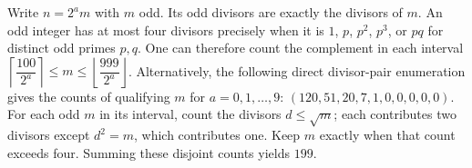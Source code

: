 Write $n=2^a m$ with $m$ odd. Its odd divisors are exactly the divisors of $m$. An odd integer has at most four divisors precisely when it is $1$, $p$, $p^2$, $p^3$, or $pq$ for distinct odd primes $p,q$. One can therefore count the complement in each interval $\left\lceil\dfrac{100}{2^a}\right\rceil\le m\le\left\lfloor\dfrac{999}{2^a}\right\rfloor$. Alternatively, the following direct divisor-pair enumeration gives the counts of qualifying $m$ for $a=0,1,\ldots,9$: $(120, 51, 20, 7, 1, 0, 0, 0, 0, 0)$. For each odd $m$ in its interval, count the divisors $d\le\sqrt m$; each contributes two divisors except $d^2=m$, which contributes one. Keep $m$ exactly when that count exceeds four. Summing these disjoint counts yields $\boxed{199}$.
